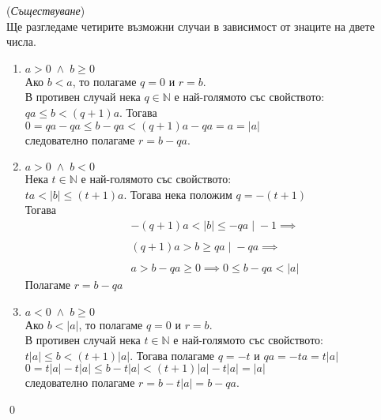\documentclass[a4paper, 12pt, oneside]{article}
\theoremstyle{definition}
\renewenvironment{proof}{\noindent{\bf Доказателство.}\hspace*{1em}}{\qed\par}
\newcommand{\N}{\mathbb{N}}
\begin{document}
\begin{proof}
    (\textit{Съществуване}) \\
    Ще разгледаме четирите възможни случаи в зависимост от знаците на двете числа.

    \begin{enumerate}
        \item $a > 0 \; \land \; b \geq 0$ \\

        Ако $b < a$,  то полагаме $q = 0$ и $r = b$. \\
        
        В противен случай нека $q \in \N$ е най-голямото със свойството: \\
        $qa \leq b < (q + 1)a$. Тогава \\
        $0 = qa - qa \leq b - qa < (q + 1)a - qa = a = |a|$ \\
        следователно полагаме $r = b - qa$.

        \item $a > 0 \; \land \; b < 0$ \\
        Нека $t \in \N$ е най-голямото със свойството: \\
        $ta < |b| \leq (t + 1)a$. Тогава нека положим $q = -(t + 1)$ \\
        Тогава
        \begin{align*}
            -(q + 1)a < |b| \leq -qa \; | \; -1 \implies \\\\
            (q + 1)a > b \geq qa \; | \; - qa \implies \\\\
            a > b - qa \geq 0 \implies 0 \leq b - qa < |a| 
        \end{align*}
        Полагаме $r = b - qa$

        \item $a < 0 \; \land \; b \geq 0$ \\

        Ако $b < |a|$,  то полагаме $q = 0$ и $r = b$. \\
        
        В противен случай нека $t \in \N$ е най-голямото със свойството: \\
        $t|a| \leq b < (t + 1)|a|$. Тогава полагаме $q = -t$ и $qa = -ta = t|a|$\\
        $0 = t|a| - t|a| \leq b - t|a| < (t + 1)|a| - t|a| = |a|$ \\
        следователно полагаме $r = b - t|a| = b - qa$.


\end{enumerate}
\end{proof}
\end{document}
